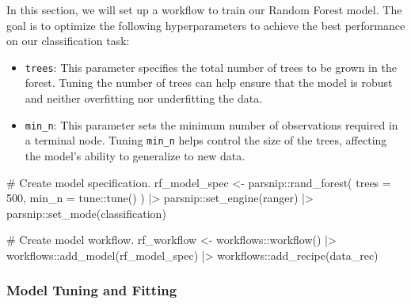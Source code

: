 \documentclass[
  letterpaper,
  DIV=11,
  numbers=noendperiod]{scrartcl}
\newenvironment{Shaded}{\begin{snugshade}}{\end{snugshade}}
\newcommand{\AttributeTok}[1]{\textcolor[rgb]{0.40,0.45,0.13}{#1}}
\newcommand{\CommentTok}[1]{\textcolor[rgb]{0.37,0.37,0.37}{#1}}
\newcommand{\DecValTok}[1]{\textcolor[rgb]{0.68,0.00,0.00}{#1}}
\newcommand{\FunctionTok}[1]{\textcolor[rgb]{0.28,0.35,0.67}{#1}}
\newcommand{\NormalTok}[1]{\textcolor[rgb]{0.00,0.23,0.31}{#1}}
\newcommand{\OtherTok}[1]{\textcolor[rgb]{0.00,0.23,0.31}{#1}}
\newcommand{\SpecialCharTok}[1]{\textcolor[rgb]{0.37,0.37,0.37}{#1}}
\newcommand{\StringTok}[1]{\textcolor[rgb]{0.13,0.47,0.30}{#1}}
\providecommand{\tightlist}{%
  \setlength{\itemsep}{0pt}\setlength{\parskip}{0pt}}\usepackage{longtable,booktabs,array}
\begin{document}
In this section, we will set up a workflow to train our Random Forest
model. The goal is to optimize the following hyperparameters to achieve
the best performance on our classification task:

\begin{itemize}
\tightlist
\item
  \texttt{trees}: This parameter specifies the total number of trees to
  be grown in the forest. Tuning the number of trees can help ensure
  that the model is robust and neither overfitting nor underfitting the
  data.
\item
  \texttt{min\_n}: This parameter sets the minimum number of
  observations required in a terminal node. Tuning \texttt{min\_n} helps
  control the size of the trees, affecting the model's ability to
  generalize to new data.
\end{itemize}

\begin{Shaded}
\begin{Highlighting}[]
\CommentTok{\# Create model specification.}
\NormalTok{rf\_model\_spec }\OtherTok{\textless{}{-}} 
\NormalTok{  parsnip}\SpecialCharTok{::}\FunctionTok{rand\_forest}\NormalTok{(}
    \AttributeTok{trees =} \DecValTok{500}\NormalTok{,}
    \AttributeTok{min\_n =}\NormalTok{ tune}\SpecialCharTok{::}\FunctionTok{tune}\NormalTok{()}
\NormalTok{  ) }\SpecialCharTok{|\textgreater{}}
\NormalTok{  parsnip}\SpecialCharTok{::}\FunctionTok{set\_engine}\NormalTok{(}\StringTok{\textquotesingle{}ranger\textquotesingle{}}\NormalTok{) }\SpecialCharTok{|\textgreater{}}
\NormalTok{  parsnip}\SpecialCharTok{::}\FunctionTok{set\_mode}\NormalTok{(}\StringTok{\textquotesingle{}classification\textquotesingle{}}\NormalTok{)}

\CommentTok{\# Create model workflow.}
\NormalTok{rf\_workflow }\OtherTok{\textless{}{-}}\NormalTok{ workflows}\SpecialCharTok{::}\FunctionTok{workflow}\NormalTok{() }\SpecialCharTok{|\textgreater{}}
\NormalTok{  workflows}\SpecialCharTok{::}\FunctionTok{add\_model}\NormalTok{(rf\_model\_spec) }\SpecialCharTok{|\textgreater{}}
\NormalTok{  workflows}\SpecialCharTok{::}\FunctionTok{add\_recipe}\NormalTok{(data\_rec)}
\end{Highlighting}
\end{Shaded}

\subsubsection{Model Tuning and
Fitting}\label{model-tuning-and-fitting-5}
\end{document}
